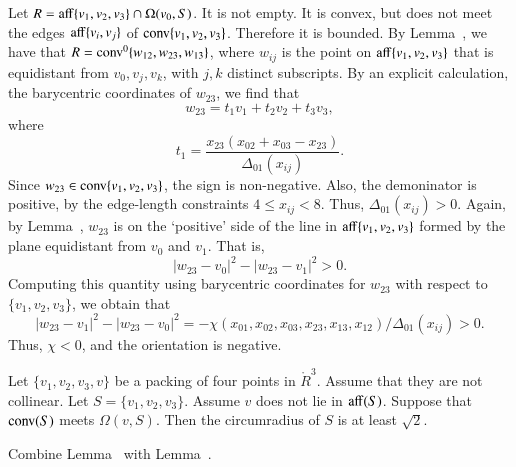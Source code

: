 \begin{tarskidata}
\begin{tarski}
\begin{proved} Let $R = {\operatorname{aff}}\{v_1,v_2,v_3\}\cap\Omega(v_0,S)$.
It is not empty.  It is convex, but does not meet the edges
${\operatorname{aff}}\{v_i,v_j\}$ of ${\operatorname{conv}}\{v_1,v_2,v_3\}$.  Therefore it
is bounded.  By Lemma~, we have that
$R = {\operatorname{conv}}^0\{w_{12},w_{23},w_{13}\}$, where $w_{ij}$ is the point
on ${\operatorname{aff}}\{v_1,v_2,v_3\}$ that is equidistant from $v_0,v_j,v_k$,
with $j,k$ distinct subscripts.  By an explicit calculation,
the barycentric coordinates of $w_{23}$, we find that
   $$w_{23} = t_1 v_1 + t_2 v_2 + t_3 v_3,$$
where $$t_1 = \frac{x_{23} (x_{02} + x_{03} - x_{23})}{\Delta_{01}(x_{ij})}.$$
Since $w_{23}\in{\operatorname{conv}}\{v_1,v_2,v_3\}$, the sign is non-negative.
Also, the demoninator is positive, by the edge-length constraints
$4\le x_{ij} < 8$.  Thus, $\Delta_{01}(x_{ij}) > 0$.
Again, by Lemma~, $w_{23}$ is on the `positive'
side of the line in ${\operatorname{aff}}\{v_1,v_2,v_3\}$ formed by the plane
equidistant from $v_0$ and $v_1$.  That is,
   $$|w_{23}-v_0|^2 - |w_{23}-v_1|^2 > 0.$$
Computing this quantity using barycentric coordinates for $w_{23}$
with respect
to $\{v_1,v_2,v_3\}$, we obtain that
   $$|w_{23}-v_1|^2 - |w_{23}-v_0|^2 = 
   -\chi(x_{01},x_{02},x_{03},x_{23},x_{13},x_{12})/{\Delta_{01}(x_{ij})} >0.$$
Thus, $\chi < 0$, and the orientation is negative.
\swallowed\end{proved}
\end{tarski}







\begin{tarski}

\begin{lemma}
Let $\{v_1,v_2,v_3,v\}$ be a packing of four points in $\ring{R}^3$.
Assume that they are not collinear.
Let $S=\{v_1,v_2,v_3\}$.
Assume $v$ does not lie in ${\operatorname{aff}}(S)$.  Suppose that
${\operatorname{conv}}(S)$ meets $\Omega(v,S)$.  Then the circumradius
of $S$ is at least $\sqrt2$.
\end{lemma}

\begin{proved} Combine Lemma~ with
Lemma~.
\swallowed\end{proved}
\end{tarski}




\end{tarskidata}
